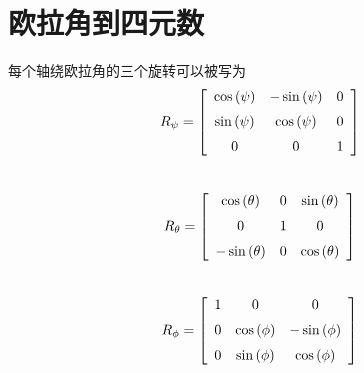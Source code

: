 

%



\section{欧拉角到四元数}
\label{sec_Eul2Quat}

每个轴绕欧拉角的三个旋转可以被写为 \\

$$ R_{\psi} =  \left[ \begin {array}{ccc} \cos \left( {\it \psi} \right) &-\sin \left( {\it \psi} \right) &0\\\noalign{\medskip}\sin \left( {\it \psi} \right) &\cos \left( {\it \psi} \right) &0\\\noalign{\medskip}0&0&1\end {array} \right] $$\\

$$ R_{\theta} =  \left[ \begin {array}{ccc} \cos \left( {\it \theta} \right) &0&\sin \left( {\it \theta} \right) \\\noalign{\medskip}0&1&0\\\noalign{\medskip}-\sin \left( {\it \theta} \right) &0&\cos \left( {\it \theta} \right) \end {array} \right] $$\\


$$ R_{\phi} =  \left[ \begin {array}{ccc} 1&0&0\\\noalign{\medskip}0&\cos \left( {\it \phi} \right) &-\sin \left( {\it \phi} \right) \\\noalign{\medskip}0&\sin \left( {\it \phi} \right) &\cos \left( {\it \phi} \right) \end {array} \right] $$\\


